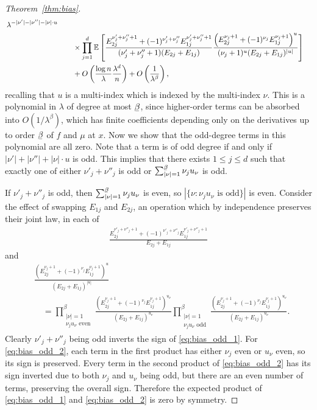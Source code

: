 \begin{proof}[Theorem~\ref{thm:bias}]
\begin{align}
    \, \lambda^{- |\nu'| - |\nu''| - |\nu| \cdot u} \\
    \nonumber
    &\qquad\times
    \prod_{j=1}^d
    \mathbb{E} \left[
      \frac{E_{2j}^{\nu'_j + \nu''_j + 1}
      + (-1)^{\nu'_j + \nu''_j} E_{1j}^{\nu'_j + \nu''_j + 1}}
      {(\nu'_j + \nu''_j + 1) (E_{2j} + E_{1j})}
      \frac{\left(E_{2j}^{\nu_j + 1}
      + (-1)^{\nu_j} E_{1j}^{\nu_j + 1}\right)^u}
      {(\nu_j + 1)^u (E_{2j} + E_{1j})^{|u|}}
    \right] \\
    \label{eq:bias}
    &\qquad+
    O \left( \frac{\log n}{\lambda} \frac{\lambda^d}{n} \right)
    + O \left( \frac{1}{\lambda^\beta} \right),
  \end{align}
  recalling that $u$ is a multi-index which is indexed by the multi-index $\nu$.
  This is a polynomial in $\lambda$ of degree at most $\flbeta$,
  since higher-order terms can be absorbed into $O(1 / \lambda^\beta)$,
  which has finite coefficients depending only on
  the derivatives up to order $\flbeta$ of $f$ and $\mu$ at $x$.
  Now we show that the odd-degree terms in this polynomial are all zero.
  Note that a term is of odd degree if and only if
  $|\nu'| + |\nu''| + |\nu| \cdot u$ is odd.
  This implies that there exists $1 \leq j \leq d$ such that
  exactly one of either
  $\nu'_j + \nu''_j$ is odd or
  $\sum_{|\nu|=1}^{\flbeta} \nu_j u_\nu$ is odd.

  If $\nu'_j + \nu''_j$ is odd, then
  $\sum_{|\nu|=1}^{\flbeta} \nu_j u_\nu$ is even, so
  $|\{\nu : \nu_j u_\nu \text{ is odd}\}|$ is even.
  Consider the effect of swapping $E_{1j}$ and $E_{2j}$,
  an operation which by independence preserves their joint law,
  in each of
  \begin{align}
    \label{eq:bias_odd_1}
    \frac{E_{2j}^{\nu'_j + \nu''_j + 1}
    + (-1)^{\nu'_j + \nu''_j} E_{1j}^{\nu'_j + \nu''_j + 1}}
    {E_{2j} + E_{1j}}
  \end{align}
  and
  \begin{align}
    \nonumber
    &\frac{\left(E_{2j}^{\nu_j + 1}
    + (-1)^{\nu_j} E_{1j}^{\nu_j + 1}\right)^u}
    {(E_{2j} + E_{1j})^{|u|}} \\
    \label{eq:bias_odd_2}
    &\quad=
    \prod_{\substack{|\nu| = 1 \\
    \nu_j u_\nu \text{ even}}}^\beta
    \frac{\left(E_{2j}^{\nu_j + 1}
    + (-1)^{\nu_j} E_{1j}^{\nu_j + 1}\right)^{u_\nu}}
    {(E_{2j} + E_{1j})^{u_\nu}}
    \prod_{\substack{|\nu| = 1 \\
    \nu_j u_\nu \text{ odd}}}^\beta
    \frac{\left(E_{2j}^{\nu_j + 1}
    + (-1)^{\nu_j} E_{1j}^{\nu_j + 1}\right)^{u_\nu}}
    {(E_{2j} + E_{1j})^{u_\nu}}.
  \end{align}
  Clearly $\nu'_j + \nu''_j$ being odd inverts the
  sign of \eqref{eq:bias_odd_1}.
  For \eqref{eq:bias_odd_2},
  each term in the first product has either
  $\nu_j$ even or $u_\nu$ even, so its sign is preserved.
  Every term in the second product of \eqref{eq:bias_odd_2}
  has its sign inverted due to both $\nu_j$ and $u_\nu$ being odd,
  but there are an even number of terms,
  preserving the overall sign.
  Therefore the expected product
  of \eqref{eq:bias_odd_1} and \eqref{eq:bias_odd_2} is zero by symmetry.


\end{proof}
